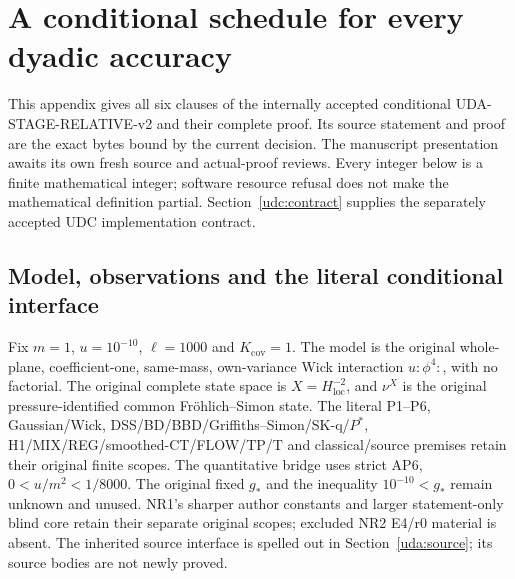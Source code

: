 \documentclass[11pt]{article}
\theoremstyle{plain}
\theoremstyle{definition}
\theoremstyle{remark}
\begin{document}
\clearpage
\begingroup
\normalsize
\renewcommand{\theHequation}{uda.\arabic{equation}}
\section{A conditional schedule for every dyadic accuracy}
\label{uda:current}
This appendix gives all six clauses of the internally accepted conditional
UDA-STAGE-RELATIVE-v2 and their complete proof. Its source statement and proof
are the exact bytes bound by the current decision. The manuscript presentation
awaits its own fresh source and actual-proof reviews. Every integer below is a
finite mathematical integer; software resource refusal does not make the
mathematical definition partial. Section~\ref{udc:contract} supplies the separately
accepted UDC implementation contract.

\subsection{Model, observations and the literal conditional interface}
Fix $m=1$, $u=10^{-10}$, $\ell=1000$ and $K_{\mathrm{cov}}=1$.
The model is the original whole-plane, coefficient-one, same-mass,
own-variance Wick interaction $u{:}\phi^4{:}$, with no factorial.
The original complete state space is $X=H^{-2}_{\mathrm{loc}}$, and
$\nu^X$ is the original pressure-identified common Fr\"ohlich--Simon state.
The literal P1--P6, Gaussian/Wick, DSS/BD/BBD/Griffiths--Simon/SK-q/$P^*$,
H1/MIX/REG/smoothed-CT/FLOW/TP/T and classical/source premises retain their
original finite scopes. The quantitative bridge uses strict AP6,
$0<u/m^2<1/8000$. The original fixed $g_*$ and the inequality
$10^{-10}<g_*$ remain unknown and unused. NR1's sharper author constants and
larger statement-only blind core retain their separate original scopes;
excluded NR2 E4/r0 material is absent. The inherited source interface is
spelled out in Section~\ref{uda:source}; its source bodies are not newly proved.
\end{document}
